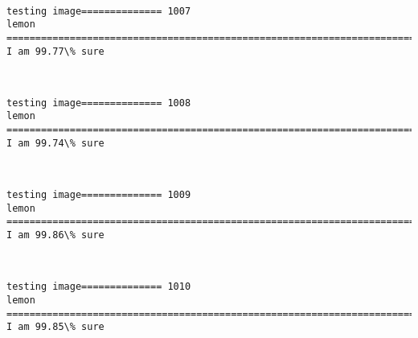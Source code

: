 \documentclass[11pt]{article}
\begin{document}
    \begin{center}
    \end{center}
    { \hspace*{\fill} \\}
    
    \begin{Verbatim}[commandchars=\\\{\}]
testing image============== 1007
lemon
============================================================================
I am 99.77\% sure

    \end{Verbatim}

    \begin{center}
    \end{center}
    { \hspace*{\fill} \\}
    
    \begin{Verbatim}[commandchars=\\\{\}]
testing image============== 1008
lemon
============================================================================
I am 99.74\% sure

    \end{Verbatim}

    \begin{center}
    \end{center}
    { \hspace*{\fill} \\}
    
    \begin{Verbatim}[commandchars=\\\{\}]
testing image============== 1009
lemon
============================================================================
I am 99.86\% sure

    \end{Verbatim}

    \begin{center}
    \end{center}
    { \hspace*{\fill} \\}
    
    \begin{Verbatim}[commandchars=\\\{\}]
testing image============== 1010
lemon
============================================================================
I am 99.85\% sure

    \end{Verbatim}
\end{document}
